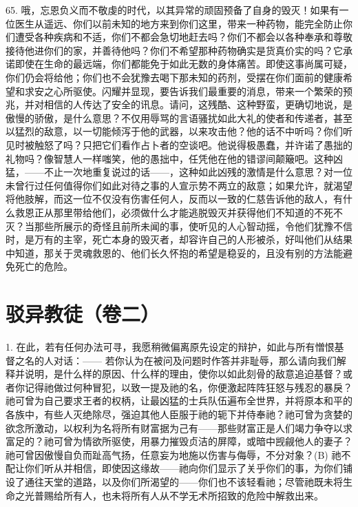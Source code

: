 65. 哦，忘恩负义而不敬虔的时代，以其异常的顽固预备了自身的毁灭！如果有一位医生从遥远、你们以前未知的地方来到你们这里，带来一种药物，能完全防止你们遭受各种疾病和不适，你们不都会急切地赶去吗？你们不都会以各种奉承和尊敬接待他进你们的家，并善待他吗？你们不希望那种药物确实是货真价实的吗？它承诺即使在生命的最远端，你们都能免于如此无数的身体痛苦。即使这事尚属可疑，你们仍会将给他；你们也不会犹豫去喝下那未知的药剂，受摆在你们面前的健康希望和求安之心所驱使。闪耀并显现，要告诉我们最重要的消息，带来一个繁荣的预兆，并对相信的人传达了安全的讯息。请问，这残酷、这种野蛮，更确切地说，是傲慢的骄傲，是什么意思？不仅用辱骂的言语骚扰如此大礼的使者和传递者，甚至以猛烈的敌意，以一切能倾泻于他的武器，以来攻击他？他的话不中听吗？你们听见时被触怒了吗？只把它们看作占卜者的空谈吧。他说得极愚蠢，并许诺了愚拙的礼物吗？像智慧人一样嗤笑，他的愚拙中，任凭他在他的错谬间颠簸吧。这种凶猛，——不止一次地重复说过的话——，这种如此凶残的激情是什么意思？对一位未曾行过任何值得你们如此对待之事的人宣示势不两立的敌意；如果允许，就渴望将他肢解，而这一位不仅没有伤害任何人，反而以一致的仁慈告诉他的敌人，有什么救恩正从那里带给他们，必须做什么才能逃脱毁灭并获得他们不知道的不死不灭？当那些所展示的奇怪且前所未闻的事，使听见的人心智动摇，令他们犹豫不信时，是万有的主宰，死亡本身的毁灭者，却容许自己的人形被杀，好叫他们从结果中知道，那关于灵魂救恩的、他们长久怀抱的希望是稳妥的，且没有别的方法能避免死亡的危险。\par



\section{驳异教徒（卷二）}

1. 在此，若有任何办法可寻，我愿稍微偏离原先设定的辩护，如此与所有憎恨基督之名的人对话：—— 若你认为在被问及问题时作答并非耻辱，那么请向我们解释并说明，是什么样的原因、什么样的理由，使你以如此刻骨的敌意追迫基督？或者你记得祂做过何种冒犯，以致一提及祂的名，你便激起阵阵狂怒与残忍的暴戾？祂可曾为自己要求王者的权柄，让最凶猛的士兵队伍遍布全世界，并将原本和平的各族中，有些人灭绝除尽，强迫其他人臣服于祂的轭下并侍奉祂？祂可曾为贪婪的欲念所激动，以权利为名将所有财富据为己有——那些财富正是人们竭力争夺以求富足的？祂可曾为情欲所驱使，用暴力摧毁贞洁的屏障，或暗中觊觎他人的妻子？祂可曾因傲慢自负而趾高气扬，任意妄为地施以伤害与侮辱，不分对象？(B) 祂不配让你们听从并相信，即使因这缘故——祂向你们显示了关乎你们的事，为你们铺设了通往天堂的道路，以及你们所渴望的——你们也不该轻看祂；尽管祂既未将生命之光普赐给所有人，也未将所有人从不学无术所招致的危险中解救出来。\par

